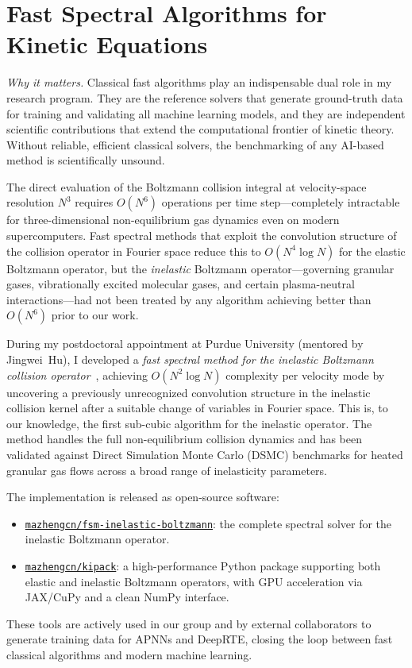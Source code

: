 \section{Fast Spectral Algorithms for Kinetic Equations}

\noindent\textit{Why it matters.}\enspace
Classical fast algorithms play an indispensable dual role in my research
program.  They are the reference solvers that generate ground-truth data
for training and validating all machine learning models, and they are
independent scientific contributions that extend the computational frontier
of kinetic theory.  Without reliable, efficient classical solvers, the
benchmarking of any AI-based method is scientifically unsound.

The direct evaluation of the Boltzmann collision integral at velocity-space
resolution $N^3$ requires $O(N^6)$ operations per time step---completely
intractable for three-dimensional non-equilibrium gas dynamics even on
modern supercomputers.  Fast spectral methods that exploit the convolution
structure of the collision operator in Fourier space reduce this to
$O(N^4 \log N)$ for the elastic Boltzmann operator, but the \emph{inelastic}
Boltzmann operator---governing granular gases, vibrationally excited molecular
gases, and certain plasma-neutral interactions---had not been treated by any
algorithm achieving better than $O(N^6)$ prior to our work.

During my postdoctoral appointment at Purdue University (mentored by
Jingwei~Hu), I developed a \emph{fast spectral method for the inelastic
Boltzmann collision operator}~\cite{HU2019119}, achieving $O(N^2 \log N)$
complexity per velocity mode by uncovering a previously unrecognized
convolution structure in the inelastic collision kernel after a suitable
change of variables in Fourier space.  This is, to our knowledge, the
first sub-cubic algorithm for the inelastic operator.  The method handles
the full non-equilibrium collision dynamics and has been validated against
Direct Simulation Monte Carlo (DSMC) benchmarks for heated granular gas
flows across a broad range of inelasticity parameters.

The implementation is released as open-source software:
\begin{itemize}
  \item \href{https://github.com/mazhengcn/fsm-inelastic-boltzmann}{%
    \texttt{mazhengcn/fsm-inelastic-boltzmann}}: the complete spectral
    solver for the inelastic Boltzmann operator.
  \item \href{https://github.com/mazhengcn/kipack}{\texttt{mazhengcn/kipack}}:
    a high-performance Python package supporting both elastic and inelastic
    Boltzmann operators, with GPU acceleration via JAX/CuPy and a clean
    NumPy interface.
\end{itemize}
These tools are actively used in our group and by external collaborators to
generate training data for APNNs and DeepRTE, closing the loop between fast
classical algorithms and modern machine learning.

